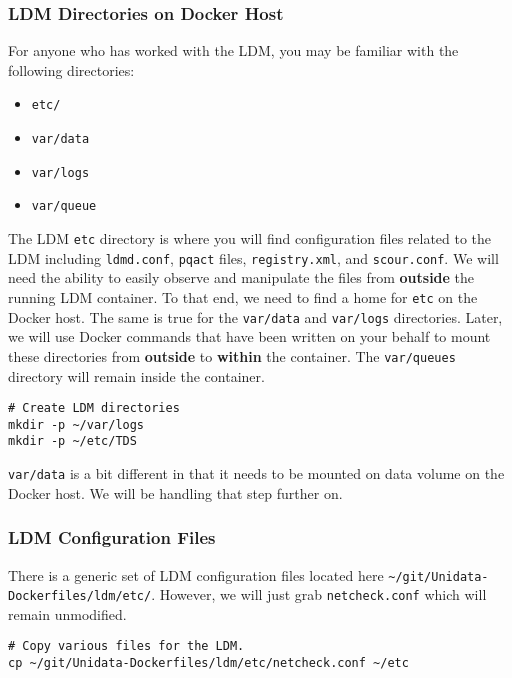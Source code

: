 \documentclass{article}
\begin{document}
\subsubsection{LDM Directories on Docker Host}
\label{sec:orgheadline17}

For anyone who has worked with the LDM, you may be familiar with the following directories:


\begin{itemize}
\item \texttt{etc/}
\item \texttt{var/data}
\item \texttt{var/logs}
\item \texttt{var/queue}
\end{itemize}


The LDM \texttt{etc} directory is where you will find configuration files related to the LDM including \texttt{ldmd.conf}, \texttt{pqact} files, \texttt{registry.xml}, and  \texttt{scour.conf}. We will need the ability to easily observe and manipulate the files from \textbf{outside} the running LDM container. To that end, we need to find a home for \texttt{etc} on the Docker host. The same is true for the \texttt{var/data} and \texttt{var/logs} directories. Later, we will use Docker commands that have been written on your behalf to mount these directories from \textbf{outside} to \textbf{within} the container. The \texttt{var/queues} directory will remain inside the container.

\begin{verbatim}
# Create LDM directories
mkdir -p ~/var/logs 
mkdir -p ~/etc/TDS
\end{verbatim}

\texttt{var/data} is a bit different in that it needs to be mounted on data volume on the Docker host. We will be handling that step further on.

\subsubsection{LDM Configuration Files}
\label{sec:orgheadline23}

There is a generic set of LDM configuration files located here \texttt{\textasciitilde{}/git/Unidata-Dockerfiles/ldm/etc/}. However, we will just grab \texttt{netcheck.conf} which will remain unmodified.

\begin{verbatim}
# Copy various files for the LDM.
cp ~/git/Unidata-Dockerfiles/ldm/etc/netcheck.conf ~/etc
\end{verbatim}
\end{document}
